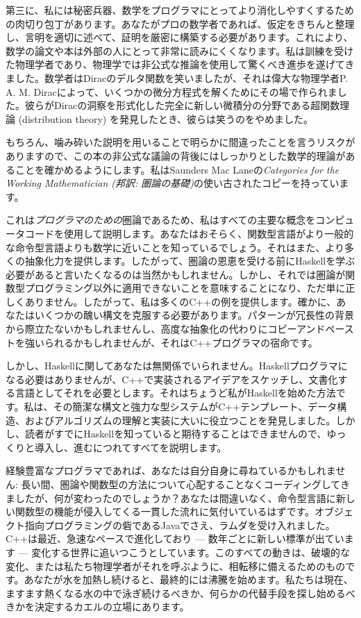 第三に、私には秘密兵器、数学をプログラマにとってより消化しやすくするための肉切り包丁があります。あなたがプロの数学者であれば、仮定をきちんと整理し、言明を適切に述べて、証明を厳密に構築する必要があります。これにより、数学の論文や本は外部の人にとって非常に読みにくくなります。私は訓練を受けた物理学者であり、物理学では非公式な推論を使用して驚くべき進歩を遂げてきました。数学者はDiracのデルタ関数を笑いましたが、それは偉大な物理学者P. A. M. Diracによって、いくつかの微分方程式を解くためにその場で作られました。彼らがDiracの洞察を形式化した完全に新しい微積分の分野である超関数理論 (distribution theory) を発見したとき、彼らは笑うのをやめました。

もちろん、噛み砕いた説明を用いることで明らかに間違ったことを言うリスクがありますので、この本の非公式な議論の背後にはしっかりとした数学的理論があることを確かめるようにします。私はSaunders Mac Laneの\emph{Categories for the Working Mathematician (邦訳: 圏論の基礎)}の使い古されたコピーを持っています。

これは\emph{プログラマのための}圏論であるため、私はすべての主要な概念をコンピュータコードを使用して説明します。あなたはおそらく、関数型言語がより一般的な命令型言語よりも数学に近いことを知っているでしょう。それはまた、より多くの抽象化力を提供します。したがって、圏論の恩恵を受ける前にHaskellを学ぶ必要があると言いたくなるのは当然かもしれません。しかし、それでは圏論が関数型プログラミング以外に適用できないことを意味することになり、ただ単に正しくありません。したがって、私は多くのC++の例を提供します。確かに、あなたはいくつかの醜い構文を克服する必要があります。パターンが冗長性の背景から際立たないかもしれませんし、高度な抽象化の代わりにコピーアンドペーストを強いられるかもしれませんが、それはC++プログラマの宿命です。

しかし、Haskellに関してあなたは無関係でいられません。Haskellプログラマになる必要はありませんが、C++で実装されるアイデアをスケッチし、文書化する言語としてそれを必要とします。それはちょうど私がHaskellを始めた方法です。私は、その簡潔な構文と強力な型システムがC++テンプレート、データ構造、およびアルゴリズムの理解と実装に大いに役立つことを発見しました。しかし、読者がすでにHaskellを知っていると期待することはできませんので、ゆっくりと導入し、進むにつれてすべてを説明します。

経験豊富なプログラマであれば、あなたは自分自身に尋ねているかもしれません: 長い間、圏論や関数型の方法について心配することなくコーディングしてきましたが、何が変わったのでしょうか？あなたは間違いなく、命令型言語に新しい関数型の機能が侵入してくる一貫した流れに気付いているはずです。オブジェクト指向プログラミングの砦であるJavaでさえ、ラムダを受け入れました。C++は最近、急速なペースで進化しており --- 数年ごとに新しい標準が出ています --- 変化する世界に追いつこうとしています。このすべての動きは、破壊的な変化、または私たち物理学者がそれを呼ぶように、相転移に備えるためのものです。あなたが水を加熱し続けると、最終的には沸騰を始めます。私たちは現在、ますます熱くなる水の中で泳ぎ続けるべきか、何らかの代替手段を探し始めるべきかを決定するカエルの立場にあります。

